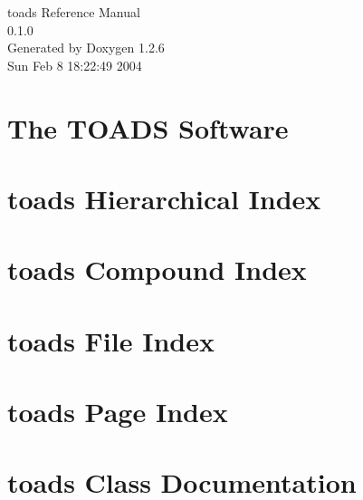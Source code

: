 \documentclass[a4paper]{article}
\begin{document}
\begin{titlepage}
\vspace*{7cm}
\begin{center}
{\Large toads Reference Manual\\[1ex]\large 0.1.0}\\
\vspace*{1cm}
{\large Generated by Doxygen 1.2.6}\\
\vspace*{0.5cm}
{\small Sun Feb 8 18:22:49 2004}\\
\end{center}
\end{titlepage}
\tableofcontents
{}
\section{The TOADS Software}
\label{index}
\section{toads Hierarchical Index}

\section{toads Compound Index}

\section{toads File Index}

\section{toads Page Index}

\section{toads Class Documentation}

























































\end{document}
